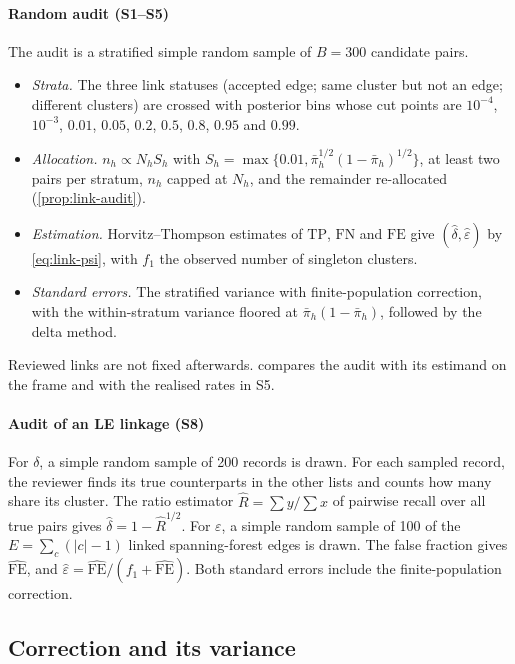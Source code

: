 \paragraph{Random audit (S1--S5)} The audit is a stratified simple random sample of $B=300$ candidate pairs.
\begin{itemize}
  \item \emph{Strata.} The three link statuses (accepted edge; same cluster but not an edge; different clusters) are crossed with posterior bins whose cut points are $10^{-4}$, $10^{-3}$, $0.01$, $0.05$, $0.2$, $0.5$, $0.8$, $0.95$ and $0.99$.
  \item \emph{Allocation.} $n_h\propto N_hS_h$ with $S_h=\max\{0.01,\bar\pi_h^{1/2}(1-\bar\pi_h)^{1/2}\}$, at least two pairs per stratum, $n_h$ capped at $N_h$, and the remainder re-allocated (\cref{prop:link-audit}).
  \item \emph{Estimation.} Horvitz--Thompson estimates of $\mathrm{TP}$, $\mathrm{FN}$ and $\mathrm{FE}$ give $(\hat\delta,\hat\varepsilon)$ by \eqref{eq:link-psi}, with $f_1$ the observed number of singleton clusters.
  \item \emph{Standard errors.} The stratified variance with finite-population correction, with the within-stratum variance floored at $\bar\pi_h(1-\bar\pi_h)$, followed by the delta method.
\end{itemize}
Reviewed links are not fixed afterwards.  compares the audit with its estimand on the frame and with the realised rates in S5.

\paragraph{Audit of an LE linkage (S8)} For $\delta$, a simple random sample of 200 records is drawn. For each sampled record, the reviewer finds its true counterparts in the other lists and counts how many share its cluster. The ratio estimator $\hat R=\sum y/\sum x$ of pairwise recall over all true pairs gives $\hat\delta=1-\hat R^{1/2}$. For $\varepsilon$, a simple random sample of 100 of the $E=\sum_c(|c|-1)$ linked spanning-forest edges is drawn. The false fraction gives $\widehat{\mathrm{FE}}$, and $\hat\varepsilon=\widehat{\mathrm{FE}}/(f_1+\widehat{\mathrm{FE}})$. Both standard errors include the finite-population correction.

\subsection{Correction and its variance}\label{app:sim-correction}

